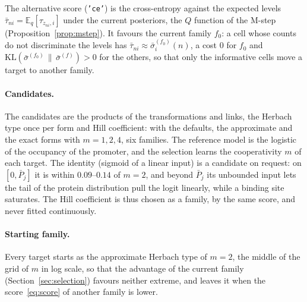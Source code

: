 \documentclass[a4paper, 11pt]{article}
\newcommand{\E}{\mathbb{E}}
\theoremstyle{plain}
\theoremstyle{remark}
\begin{document}
The alternative score (\texttt{'ce'}) is the cross-entropy against the expected levels $\bar\tau_{ni} = \E_q[\tau_{z_{ni},i}]$ under the current posteriors, the $Q$ function of the M-step (Proposition~\ref{prop:mstep}). It favours the current family $f_0$: a cell whose counts do not discriminate the levels has $\bar\tau_{ni} \approx \bar\sigma_i^{(f_0)}(n)$, a cost $0$ for $f_0$ and $\mathrm{KL}(\bar\sigma^{(f_0)} \,\|\, \bar\sigma^{(f)}) > 0$ for the others, so that only the informative cells move a target to another family.

\paragraph{Candidates.} The candidates are the products of the transformations and links, the Herbach type once per form and Hill coefficient: with the defaults, the approximate and the exact forms with $m = 1, 2, 4$, six families. The reference model is the logistic of the occupancy of the promoter, and the selection learns the cooperativity $m$ of each target. The identity (sigmoid of a linear input) is a candidate on request: on $[0, \bar P_j]$ it is within $0.09$--$0.14$ of $m = 2$, and beyond $\bar P_j$ its unbounded input lets the tail of the protein distribution pull the logit linearly, while a binding site saturates. The Hill coefficient is thus chosen as a family, by the same score, and never fitted continuously.

\paragraph{Starting family.} Every target starts as the approximate Herbach type of $m = 2$, the middle of the grid of $m$ in log scale, so that the advantage of the current family (Section~\ref{sec:selection}) favours neither extreme, and leaves it when the score~\eqref{eq:score} of another family is lower.
\end{document}
